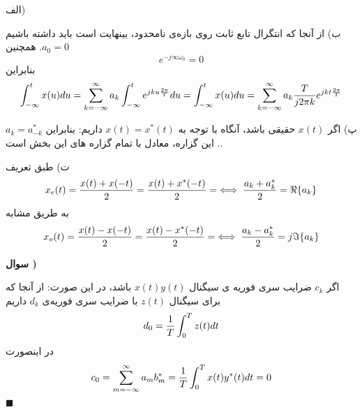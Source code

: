 \documentclass[10pt,letterpaper]{article}
\newcounter{QuestionNumber}
\newcommand{\Q}{
\textbf{
سوال \theQuestionNumber)
}
\stepcounter{QuestionNumber}
}
\begin{document}
الف)

ب)
از آنجا که انتگرال تابع ثابت روی بازه‌ی نامحدود، بینهایت است باید داشته باشیم $a_0=0$. همچنین 
$$
e^{-j\infty \omega_0}=0
$$
بنابراین
$$
\int_{-\infty}^tx(u)du=\sum_{k=-\infty}^{\infty}a_k\int_{-\infty}^te^{jku{2\pi\over T}}du
=\int_{-\infty}^tx(u)du=\sum_{k=-\infty}^{\infty}a_k{T\over j2\pi k}e^{jkt{2\pi\over T}}
$$

پ) اگر $x(t)$ حقیقی باشد، آنگاه با توجه به
$
x(t)=x^*(t)
$
 داریم:
بنابراین 
$
a_k=a^*_{-k}
$
. این گزاره، معادل با تمام گزاره های این بخش است.

ت) طبق تعریف
$$
x_e(t)={x(t)+x(-t)\over 2}={x(t)+x^*(-t)\over 2}=\iff {a_k+a^{*}_k\over 2}=\Re\{a_k\}
$$
به طریق مشابه
$$
x_o(t)={x(t)-x(-t)\over 2}={x(t)-x^*(-t)\over 2}=\iff {a_k-a^{*}_k\over 2}=j\Im\{a_k\}
$$

\Q

اگر 
$
c_k
$
 ضرایب سری فوریه ی سیگنال $x(t)y(t)$ باشد، در این صورت:
از آنجا که برای سیگنال $z(t)$ با ضرایب سری فوریه‌ی $d_k$ داریم
$$
d_0={1\over T}\int _0^T z(t)dt
$$
در اینصورت 
$$
c_0=\sum_{m=-\infty}^\infty a_mb^*_{m}={1\over T}\int_0^T x(t)y^*(t)dt=0
$$
$
\blacksquare
$
\end{document}
